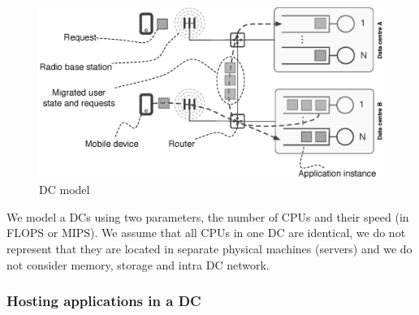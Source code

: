\subsection{\Dc}
\begin{figure}[tb]
	\centering
	\includegraphics[width=0.8\linewidth]{fig_dc_model_horizontal.eps} 
	\caption{\ac{DC} model}
	\label{fig:dc_model}
\end{figure}

We model a \ac{DC}s using two parameters, the number of CPUs and their speed (in FLOPS or MIPS).
We assume that all CPUs in one \ac{DC} are identical, we do not represent that they are located in separate physical machines (servers) and we do not consider memory, storage and intra \ac{DC} network.



\subsubsection{Hosting applications in a \ac{DC}}

